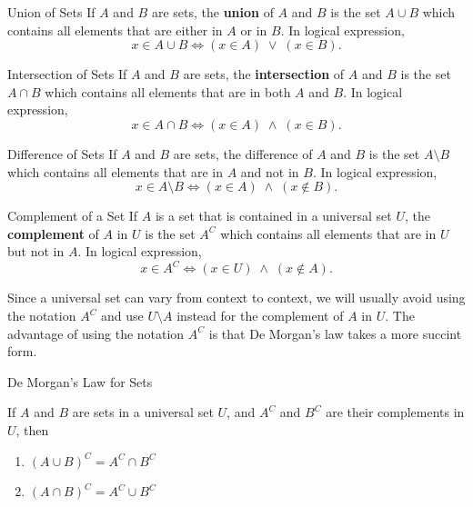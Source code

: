 \begin{definition}
{Union of Sets}
If $A$ and $B$ are sets, the {\bf union} of $A$ and $B$ is the set $A\cup B$ which contains all elements that are either in $A$ or in $B$. In logical expression,
\[x\in A\cup B\iff (x\in A)\;\vee\;(x\in B).\]
\end{definition}

\begin{definition}
{Intersection of Sets}
If $A$ and $B$ are sets, the {\bf intersection} of $A$ and $B$ is the set $A\cap B$ which contains all elements that are  in both $A$ and  $B$. In logical expression,
\[x\in A\cap B\iff (x\in A)\;\wedge\;(x\in B).\]
\end{definition}

\begin{definition}
{Difference of Sets}
If $A$ and $B$ are sets, the difference of $A$ and $B$ is the set $A\setminus B$  which contains all elements that are  in  $A$ and not in  $B$. In logical expression,
\[x\in A\setminus B\iff (x\in A)\;\wedge\;(x\notin B).\]
\end{definition}

\begin{definition}
{Complement of a Set}
If $A$ is a set that is contained in a universal set $U$, the {\bf complement} of $A$ in $U$ is the set $A^C$ which contains all elements that are in $U$ but not in $A$. In logical expression,
\[x\in A^C\iff (x\in U)\;\wedge\;(x\notin A).\]
\end{definition}

Since a universal set can vary from context to context, we will usually avoid using the notation $A^C$ and use $U\setminus A$ instead for the complement of $A$ in $U$. The advantage of using the notation $A^C$ is that De Morgan's law takes a more succint form.

\begin{proposition}{De Morgan's Law for Sets}

If $A$ and $B$ are sets in a universal set $U$, and $A^C$ and $B^C$ are their complements in $U$, then
\begin{enumerate}[1.]
\item
$(A\cup B)^C=A^C\cap B^C$
\item $(A\cap B)^C=A^C\cup B^C$
\end{enumerate}
\end{proposition}

